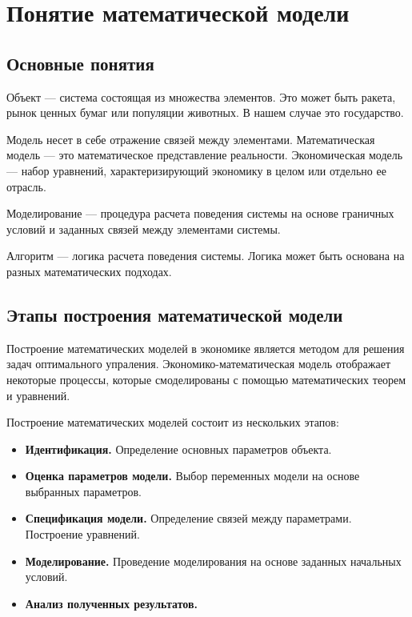 \chapter{Понятие математической модели}
\label{cha:definition}

\section{Основные понятия}

Объект --- система состоящая из множества элементов.
Это может быть ракета, рынок ценных бумаг или популяции животных.
В нашем случае это государство.

Модель несет в себе отражение связей между элементами.
Математическая модель --- это математическое представление реальности.
Экономическая модель --- набор уравнений, характеризирующий экономику в целом или отдельно ее отрасль.

Моделирование --- процедура расчета поведения системы на основе граничных условий и заданных связей между элементами системы.

Алгоритм --- логика расчета поведения системы.
Логика может быть основана на разных математических подходах.

\section{Этапы построения математической модели}

Построение математических моделей в экономике является методом для решения задач оптимального упраления.
Экономико-математическая модель отображает некоторые процессы, которые смоделированы с помощью математических теорем и уравнений.

Построение математических моделей состоит из нескольких этапов:
\begin{itemize}
	\item \textbf{Идентификация.}
	Определение основных параметров объекта.
	\item \textbf{Оценка параметров модели.}
	Выбор переменных модели на основе выбранных параметров.
	\item \textbf{Спецификация модели.}
	Определение связей между параметрами.
	Построение уравнений.
	\item \textbf{Моделирование.}
	Проведение моделирования на основе заданных начальных условий.
	\item \textbf{Анализ полученных результатов.}
\end{itemize}

